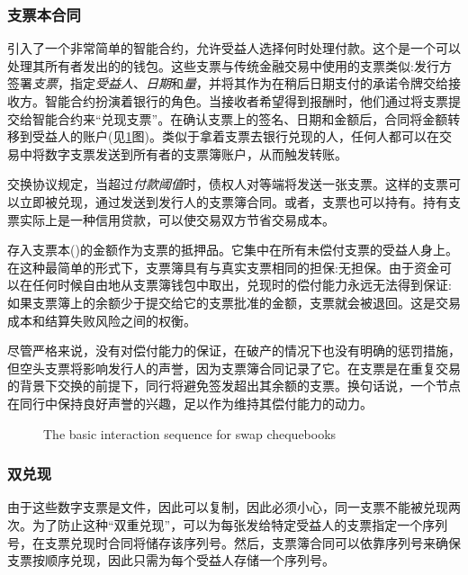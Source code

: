 \subsubsection{支票本合同}

\cite{ethersphere2016sw3}引入了一个非常简单的智能合约，允许受益人选择何时处理付款。这个是一个可以处理其所有者发出的的钱包。这些支票与传统金融交易中使用的支票类似:发行方签署\emph{支票}，指定\emph{受益人}、\emph{日期}和\emph{量}，并将其作为在稍后日期支付的承诺令牌交给接收方。智能合约扮演着银行的角色。当接收者希望得到报酬时，他们通过将支票提交给智能合约来“兑现支票”。在确认支票上的签名、日期和金额后，合同将金额转移到受益人的账户(见\ref{fig:swap-chequebook}图)。类似于拿着支票去银行兑现的人，任何人都可以在交易中将数字支票发送到所有者的支票簿账户，从而触发转账。 

交换协议规定，当超过\emph{付款阈值}时，债权人对等端将发送一张支票。这样的支票可以立即被兑现，通过发送到发行人的支票簿合同。或者，支票也可以持有。持有支票实际上是一种信用贷款，可以使交易双方节省交易成本。 

存入支票本()的金额作为支票的抵押品。它集中在所有未偿付支票的受益人身上。在这种最简单的形式下，支票簿具有与真实支票相同的担保:无担保。由于资金可以在任何时候自由地从支票簿钱包中取出，兑现时的偿付能力永远无法得到保证:如果支票簿上的余额少于提交给它的支票批准的金额，支票就会被退回。这是交易成本和结算失败风险之间的权衡。

尽管严格来说，没有对偿付能力的保证，在破产的情况下也没有明确的惩罚措施，但空头支票将影响发行人的声誉，因为支票簿合同记录了它。在支票是在重复交易的背景下交换的前提下，同行将避免签发超出其余额的支票。换句话说，一个节点在同行中保持良好声誉的兴趣，足以作为维持其偿付能力的动力。


\begin{figure}[htbp]
\centering

\caption[The basic interaction sequence for swap chequebooks \statusgreen]{The basic interaction sequence for swap chequebooks}
\label{fig:swap-chequebook}
\end{figure}


\subsubsection{双兑现}

由于这些数字支票是文件，因此可以复制，因此必须小心，同一支票不能被兑现两次。为了防止这种“双重兑现”，可以为每张发给特定受益人的支票指定一个序列号，在支票兑现时合同将储存该序列号。然后，支票簿合同可以依靠序列号来确保支票按顺序兑现，因此只需为每个受益人存储一个序列号。

